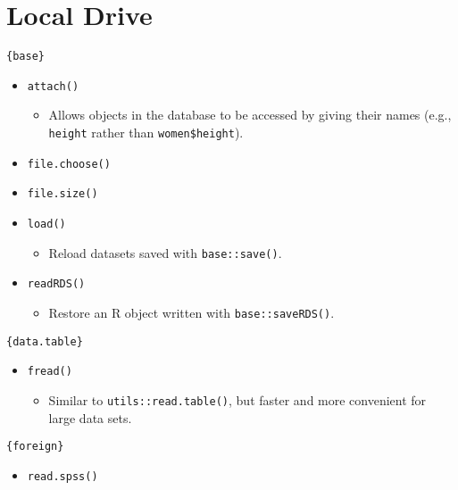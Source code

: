 \documentclass[
]{book}
\providecommand{\tightlist}{%
  \setlength{\itemsep}{0pt}\setlength{\parskip}{0pt}}
\begin{document}
\hypertarget{local-drive}{%
\section{Local Drive}\label{local-drive}}

\texttt{\{base\}}

\begin{itemize}
\tightlist
\item
  \texttt{attach()}

  \begin{itemize}
  \tightlist
  \item
    Allows objects in the database to be accessed by giving their names (e.g., \texttt{height} rather than \texttt{women\$height}).
  \end{itemize}
\item
  \texttt{file.choose()}
\item
  \texttt{file.size()}
\item
  \texttt{load()}

  \begin{itemize}
  \tightlist
  \item
    Reload datasets saved with \texttt{base::save()}.
  \end{itemize}
\item
  \texttt{readRDS()}

  \begin{itemize}
  \tightlist
  \item
    Restore an R object written with \texttt{base::saveRDS()}.
  \end{itemize}
\end{itemize}

\texttt{\{data.table\}}

\begin{itemize}
\tightlist
\item
  \texttt{fread()}

  \begin{itemize}
  \tightlist
  \item
    Similar to \texttt{utils::read.table()}, but faster and more convenient for large data sets.
  \end{itemize}
\end{itemize}

\texttt{\{foreign\}}

\begin{itemize}
\tightlist
\item
  \texttt{read.spss()}
\end{itemize}
\end{document}
